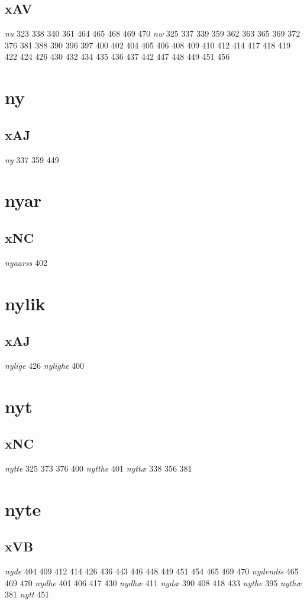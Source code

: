 \documentclass[a4paper,twocolumn]{article}
\begin{document}
\subsection{xAV}
\label{sec:org023c9aa}
\emph{nu} 323 338 340 361 464 465 468 469 470 \emph{nw} 325 337 339 359 362 363 365 369 372 376 381 388 390 396 397 400 402 404 405 406 408 409 410 412 414 417 418 419 422 424 426 430 432 434 435 436 437 442 447 448 449 451 456 
\section{ny}
\label{sec:org8fa80dd}
\subsection{xAJ}
\label{sec:orgdacd710}
\emph{ny} 337 359 449 
\section{nyar}
\label{sec:orgf3436ef}
\subsection{xNC}
\label{sec:orgbcc22a6}
\emph{nyaarss} 402 
\section{nylik}
\label{sec:org89c9ad3}
\subsection{xAJ}
\label{sec:orgffd4c35}
\emph{nylige} 426 \emph{nylighe} 400 
\section{nyt}
\label{sec:org39655d3}
\subsection{xNC}
\label{sec:org5e83964}
\emph{nytte} 325 373 376 400 \emph{nytthe} 401 \emph{nyttæ} 338 356 381 
\section{nyte}
\label{sec:org2dc28a0}
\subsection{xVB}
\label{sec:org7522935}
\emph{nyde} 404 409 412 414 426 436 443 446 448 449 451 454 465 469 470 \emph{nydendis} 465 469 470 \emph{nydhe} 401 406 417 430 \emph{nydhæ} 411 \emph{nydæ} 390 408 418 433 \emph{nythe} 395 \emph{nythæ} 381 \emph{nytt} 451 
\end{document}
